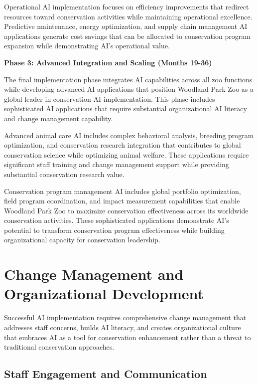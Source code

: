 \documentclass[
  Letterpaper,
]{scrbook}
\begin{document}
Operational AI implementation focuses on efficiency improvements that
redirect resources toward conservation activities while maintaining
operational excellence. Predictive maintenance, energy optimization, and
supply chain management AI applications generate cost savings that can
be allocated to conservation program expansion while demonstrating AI's
operational value.

\textbf{Phase 3: Advanced Integration and Scaling (Months 19-36)}

The final implementation phase integrates AI capabilities across all zoo
functions while developing advanced AI applications that position
Woodland Park Zoo as a global leader in conservation AI implementation.
This phase includes sophisticated AI applications that require
substantial organizational AI literacy and change management capability.

Advanced animal care AI includes complex behavioral analysis, breeding
program optimization, and conservation research integration that
contributes to global conservation science while optimizing animal
welfare. These applications require significant staff training and
change management support while providing substantial conservation
research value.

Conservation program management AI includes global portfolio
optimization, field program coordination, and impact measurement
capabilities that enable Woodland Park Zoo to maximize conservation
effectiveness across its worldwide conservation activities. These
sophisticated applications demonstrate AI's potential to transform
conservation program effectiveness while building organizational
capacity for conservation leadership.

\section{Change Management and Organizational
Development}\label{change-management-and-organizational-development}

Successful AI implementation requires comprehensive change management
that addresses staff concerns, builds AI literacy, and creates
organizational culture that embraces AI as a tool for conservation
enhancement rather than a threat to traditional conservation approaches.

\subsection{Staff Engagement and
Communication}\label{staff-engagement-and-communication}
\end{document}
